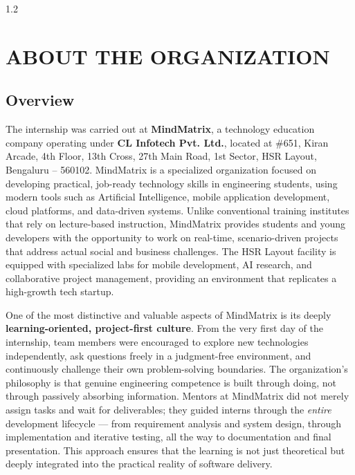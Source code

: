 \documentclass[12pt,a4paper]{report}
\begin{document}
\begin{spacing}{1.2}
\tableofcontents
\end{spacing}
\newpage

\setcounter{page}{1}

\chapter{ABOUT THE ORGANIZATION}

\section{Overview}

The internship was carried out at \textbf{MindMatrix}, a technology education company operating under \textbf{CL Infotech Pvt. Ltd.}, located at \#651, Kiran Arcade, 4th Floor, 13th Cross, 27th Main Road, 1st Sector, HSR Layout, Bengaluru -- 560102. MindMatrix is a specialized organization focused on developing practical, job-ready technology skills in engineering students, using modern tools such as Artificial Intelligence, mobile application development, cloud platforms, and data-driven systems. Unlike conventional training institutes that rely on lecture-based instruction, MindMatrix provides students and young developers with the opportunity to work on real-time, scenario-driven projects that address actual social and business challenges. The HSR Layout facility is equipped with specialized labs for mobile development, AI research, and collaborative project management, providing an environment that replicates a high-growth tech startup.

\vspace{0.4cm}

One of the most distinctive and valuable aspects of MindMatrix is its deeply \textbf{learning-oriented, project-first culture}. From the very first day of the internship, team members were encouraged to explore new technologies independently, ask questions freely in a judgment-free environment, and continuously challenge their own problem-solving boundaries. The organization's philosophy is that genuine engineering competence is built through doing, not through passively absorbing information. Mentors at MindMatrix did not merely assign tasks and wait for deliverables; they guided interns through the \textit{entire} development lifecycle — from requirement analysis and system design, through implementation and iterative testing, all the way to documentation and final presentation. This approach ensures that the learning is not just theoretical but deeply integrated into the practical reality of software delivery.
\end{document}
